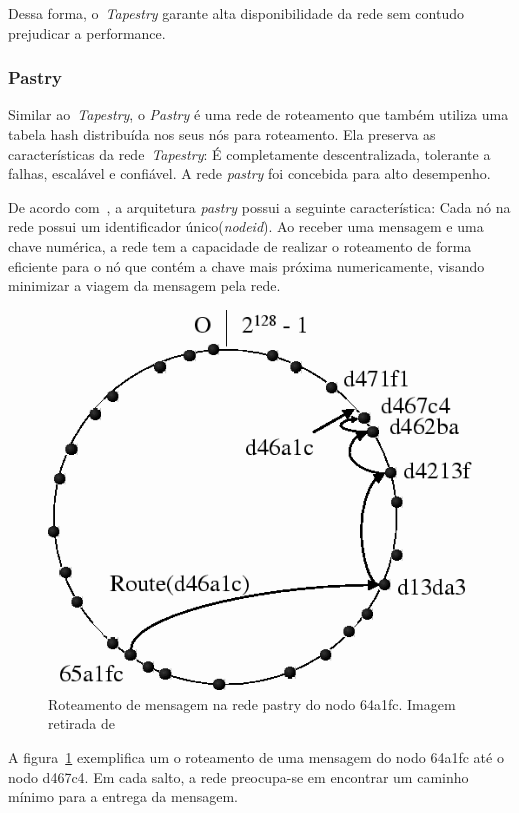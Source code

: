 Dessa forma, o~\emph{Tapestry} garante alta disponibilidade da rede sem contudo prejudicar a performance.

\subsubsection{Pastry}

Similar ao~\emph{Tapestry}, o \emph{Pastry} é uma rede de roteamento que também utiliza uma tabela hash distribuída nos seus nós para roteamento. Ela preserva as características da rede~\emph{Tapestry}: É completamente descentralizada, tolerante a falhas, escalável e confiável. A rede \emph{pastry} foi concebida para alto desempenho.

De acordo com~\cite{rowstron01}, a arquitetura \emph{pastry} possui a seguinte característica: Cada nó na rede possui um identificador único(\emph{nodeid}). Ao receber uma mensagem e uma chave numérica, a rede tem a capacidade de realizar o roteamento de forma eficiente para o nó que contém a chave mais próxima numericamente, visando minimizar a viagem da mensagem pela rede.

\begin{figure}
	\centering
	\includegraphics[scale=0.5]{images/roteamento-pastry.png}
	\caption{Roteamento de mensagem na rede pastry do nodo 64a1fc. Imagem retirada de~\cite{rowstron01}}
	\label{fig:roteamento-pastry}
\end{figure}

A figura~\ref{fig:roteamento-pastry} exemplifica um o roteamento de uma mensagem do nodo 64a1fc até o nodo d467c4. Em cada salto, a rede preocupa-se em encontrar um caminho mínimo para a entrega da mensagem.

